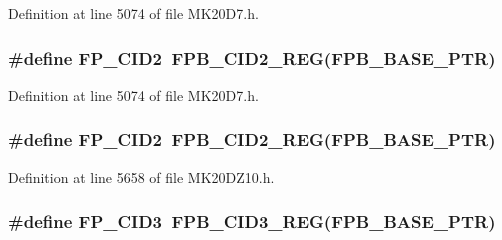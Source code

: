 Definition at line 5074 of file M\+K20\+D7.\+h.

\subsubsection[{\texorpdfstring{F\+P\+\_\+\+C\+I\+D2}{FP_CID2}}]{\setlength{\rightskip}{0pt plus 5cm}\#define F\+P\+\_\+\+C\+I\+D2~{\bf F\+P\+B\+\_\+\+C\+I\+D2\+\_\+\+R\+EG}({\bf F\+P\+B\+\_\+\+B\+A\+S\+E\+\_\+\+P\+TR})}\hypertarget{group___f_p_b___register___accessor___macros_ga8567b72cab0a5adaed761d5b545f678e}{}\label{group___f_p_b___register___accessor___macros_ga8567b72cab0a5adaed761d5b545f678e}


Definition at line 5074 of file M\+K20\+D7.\+h.

\subsubsection[{\texorpdfstring{F\+P\+\_\+\+C\+I\+D2}{FP_CID2}}]{\setlength{\rightskip}{0pt plus 5cm}\#define F\+P\+\_\+\+C\+I\+D2~{\bf F\+P\+B\+\_\+\+C\+I\+D2\+\_\+\+R\+EG}({\bf F\+P\+B\+\_\+\+B\+A\+S\+E\+\_\+\+P\+TR})}\hypertarget{group___f_p_b___register___accessor___macros_ga8567b72cab0a5adaed761d5b545f678e}{}\label{group___f_p_b___register___accessor___macros_ga8567b72cab0a5adaed761d5b545f678e}


Definition at line 5658 of file M\+K20\+D\+Z10.\+h.

\subsubsection[{\texorpdfstring{F\+P\+\_\+\+C\+I\+D3}{FP_CID3}}]{\setlength{\rightskip}{0pt plus 5cm}\#define F\+P\+\_\+\+C\+I\+D3~{\bf F\+P\+B\+\_\+\+C\+I\+D3\+\_\+\+R\+EG}({\bf F\+P\+B\+\_\+\+B\+A\+S\+E\+\_\+\+P\+TR})}\hypertarget{group___f_p_b___register___accessor___macros_gacb056c6cfc1741d7d65a4ceb25b0c9ff}{}\label{group___f_p_b___register___accessor___macros_gacb056c6cfc1741d7d65a4ceb25b0c9ff}


